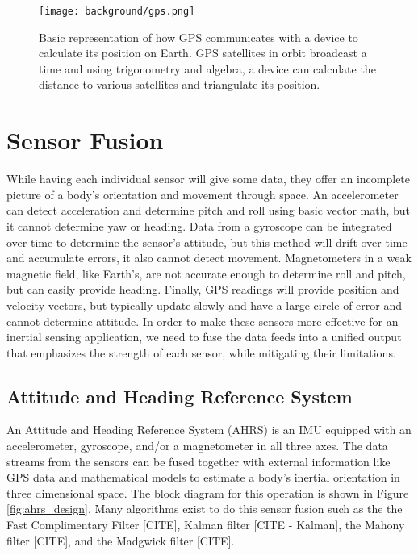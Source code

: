 \begin{figure}[h!]
    \caption[GPS diagram]{Basic representation of how GPS communicates with a device to calculate its position on Earth.
    GPS satellites in orbit broadcast a time and using trigonometry and algebra, a device can calculate the distance to various satellites and triangulate its position.}
    \label{fig:gps}
    \centering
    \texttt{[image: background/gps.png]}
\end{figure}

\section{Sensor Fusion} \label{sec:sensor_fusion}
While having each individual sensor will give some data, they offer an incomplete picture of a body's orientation and movement through space.
An accelerometer can detect acceleration and determine pitch and roll using basic vector math, but it cannot determine yaw or heading.
Data from a gyroscope can be integrated over time to determine the sensor's attitude, but this method will drift over time and accumulate errors, it also cannot detect movement.
Magnetometers in a weak magnetic field, like Earth's, are not accurate enough to determine roll and pitch, but can easily provide heading.
Finally, GPS readings will provide position and velocity vectors, but typically update slowly and have a large circle of error and cannot determine attitude.
In order to make these sensors more effective for an inertial sensing application, we need to fuse the data feeds into a unified output that emphasizes the strength of each sensor, while mitigating their limitations.

\subsection{Attitude and Heading Reference System} \label{ssec:ahrs}
An Attitude and Heading Reference System (AHRS) is an IMU equipped with an accelerometer, gyroscope, and/or a magnetometer in all three axes.
The data streams from the sensors can be fused together with external information like GPS data and mathematical models to estimate a body's inertial orientation in three dimensional space.
The block diagram for this operation is shown in Figure \ref{fig:ahrs_design}.
Many algorithms exist to do this sensor fusion such as the the Fast Complimentary Filter [CITE], Kalman filter [CITE - Kalman], the Mahony filter [CITE], and the Madgwick filter [CITE].


